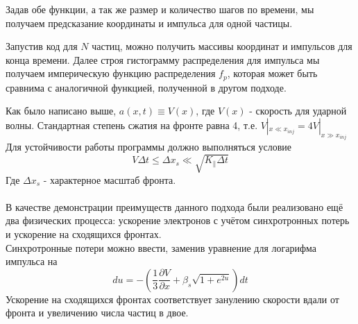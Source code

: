 \documentclass[a4paper,11pt]{article} %
\begin{document}
Задав обе функции, а так же размер и количество шагов по времени, мы получаем предсказание координаты и импульса для одной частицы.

Запустив код для $N$ частиц, можно получить массивы координат и импульсов для конца времени. Далее строя гистограмму распределения для импульса мы получаем империческую функцию распределения $f_p$, которая может быть сравнима с аналогичной функцией, полученной в другом подходе.

Как было написано выше, $a(x,t) \equiv V(x)$, где $V(x)$ - скорость для ударной волны. Стандартная степень сжатия на фронте равна 4, т.е. $V|_{x \ll x_{inj}} = 4V|_{x \gg x_{inj}}$
Для устойчивости работы программы должно выполняться условие
\begin{equation}
V\Delta t \le \Delta x_s \ll \sqrt{K_\parallel \Delta t}
\end{equation}
Где $\Delta x_s$ - характерное масштаб фронта. ~\\~\\
В качестве демонстрации преимуществ данного подхода были реализовано ещё два физических процесса: ускорение электронов с учётом синхротронных потерь и ускорение на сходящихся фронтах.\\
Синхротронные потери можно ввести, заменив уравнение для логарифма импульса на 
\begin{equation}
du = - \left( \frac{1}{3} \frac{\partial V}{\partial x}  + \beta_s\sqrt{1+e^{2u}} \right) dt
\end{equation}
Ускорение на сходящихся фронтах соответствует занулению скорости вдали от фронта и увеличению числа частиц в двое.


\end{document}
